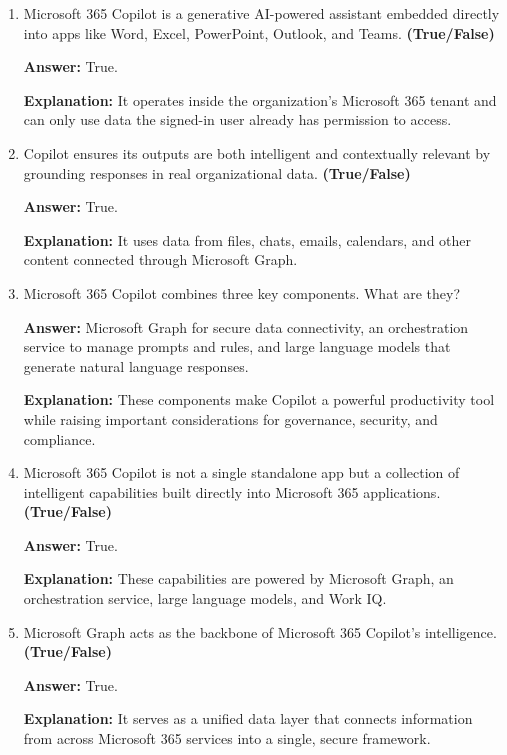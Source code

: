\documentclass[10pt]{article}
\begin{document}
\begin{enumerate}[leftmargin=*]

\item Microsoft 365 Copilot is a generative AI-powered assistant embedded directly into apps like Word, Excel, PowerPoint, Outlook, and Teams. \textbf{(True/False)}

\textbf{Answer:} True.

\textbf{Explanation:} It operates inside the organization’s Microsoft 365 tenant and can only use data the signed-in user already has permission to access.

\item Copilot ensures its outputs are both intelligent and contextually relevant by grounding responses in real organizational data. \textbf{(True/False)}

\textbf{Answer:} True.

\textbf{Explanation:} It uses data from files, chats, emails, calendars, and other content connected through Microsoft Graph.

\item Microsoft 365 Copilot combines three key components. What are they?

\textbf{Answer:} Microsoft Graph for secure data connectivity, an orchestration service to manage prompts and rules, and large language models that generate natural language responses.

\textbf{Explanation:} These components make Copilot a powerful productivity tool while raising important considerations for governance, security, and compliance.

\item Microsoft 365 Copilot is not a single standalone app but a collection of intelligent capabilities built directly into Microsoft 365 applications. \textbf{(True/False)}

\textbf{Answer:} True.

\textbf{Explanation:} These capabilities are powered by Microsoft Graph, an orchestration service, large language models, and Work IQ.

\item Microsoft Graph acts as the backbone of Microsoft 365 Copilot’s intelligence. \textbf{(True/False)}

\textbf{Answer:} True.

\textbf{Explanation:} It serves as a unified data layer that connects information from across Microsoft 365 services into a single, secure framework.


\end{enumerate}
\end{document}
